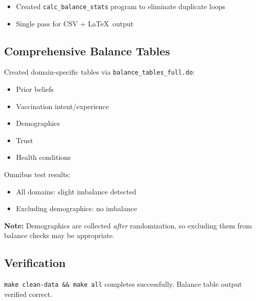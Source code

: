 \begin{itemize}
    \item Created \texttt{calc\_balance\_stats} program to eliminate duplicate loops
    \item Single pass for CSV + \LaTeX\ output
\end{itemize}

\subsection{Comprehensive Balance Tables}

Created domain-specific tables via \texttt{balance\_tables\_full.do}:
\begin{itemize}
    \item Prior beliefs
    \item Vaccination intent/experience
    \item Demographics
    \item Trust
    \item Health conditions
\end{itemize}

Omnibus test results:
\begin{itemize}
    \item All domains: slight imbalance detected
    \item Excluding demographics: no imbalance
\end{itemize}

\textbf{Note:} Demographics are collected \emph{after} randomization, so excluding them from balance checks may be appropriate.

\subsection{Verification}

\texttt{make clean-data \&\& make all} completes successfully. Balance table output verified correct.
